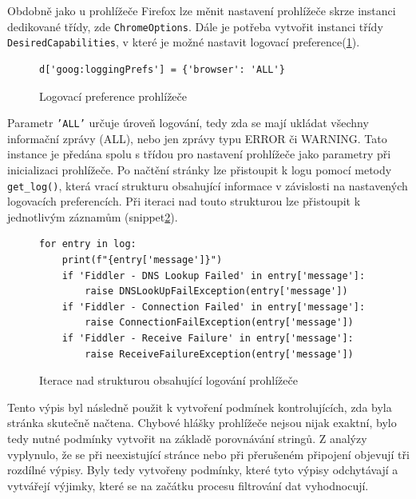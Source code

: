 \documentclass[thesis=M,czech,hidelinks]{FITthesis}[2013/05/06]
\begin{document}
Obdobně jako u prohlížeče Firefox lze měnit nastavení prohlížeče skrze instanci dedikované třídy, zde \texttt{ChromeOptions}. Dále je potřeba vytvořit instanci třídy \texttt{DesiredCapabilities}, v které je možné nastavit logovací preference(\ref{snip:log_pref}).
\begin{figure}[h]               
	\begin{verbatim}
d['goog:loggingPrefs'] = {'browser': 'ALL'}
	\end{verbatim}      
	\caption{Logovací preference prohlížeče}
	\label{snip:log_pref}
\end{figure}
Parametr \texttt{'ALL'} určuje úroveň logování, tedy zda se mají ukládat všechny informační zprávy (ALL), nebo jen zprávy typu ERROR či WARNING.
Tato instance je předána spolu s třídou pro nastavení prohlížeče jako parametry při inicializaci prohlížeče. Po načtění stránky lze přistoupit k logu pomocí metody \texttt{get_log()}, která vrací strukturu obsahující informace v závislosti na nastavených logovacích preferencích. Při iteraci nad touto strukturou lze přistoupit k jednotlivým záznamům (snippet\ref{snip:selenium_logger}). 
\begin{figure}[h]               
	\begin{verbatim}
for entry in log:
    print(f"{entry['message']}")
    if 'Fiddler - DNS Lookup Failed' in entry['message']:
        raise DNSLookUpFailException(entry['message'])
    if 'Fiddler - Connection Failed' in entry['message']:
        raise ConnectionFailException(entry['message'])
    if 'Fiddler - Receive Failure' in entry['message']:
        raise ReceiveFailureException(entry['message'])
	\end{verbatim}      
	\caption{Iterace nad strukturou obsahující logování prohlížeče}
	\label{snip:selenium_logger}
\end{figure}
Tento výpis byl následně použit k vytvoření podmínek kontrolujících, zda byla stránka skutečně načtena. Chybové hlášky prohlížeče nejsou nijak exaktní, bylo tedy nutné podmínky vytvořit na základě porovnávání stringů. Z analýzy vyplynulo, že se při neexistující stránce nebo při přerušeném připojení objevují tři rozdílné výpisy. Byly tedy vytvořeny podmínky, které tyto výpisy odchytávají a vytvářejí výjimky, které se na začátku procesu filtrování dat vyhodnocují.
\end{document}
